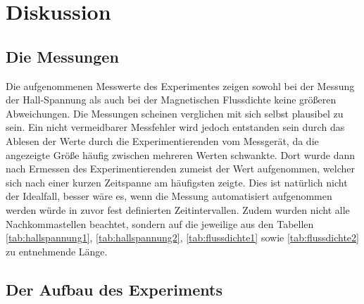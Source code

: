 \section{Diskussion}
\subsection{Die Messungen}
  Die aufgenommenen Messwerte des Experimentes zeigen sowohl bei der Messung der Hall-Spannung als auch
  bei der Magnetischen Flussdichte keine größeren Abweichungen. Die Messungen scheinen verglichen mit sich selbst
  plausibel zu sein. Ein nicht vermeidbarer Messfehler wird jedoch entstanden sein durch das Ablesen der Werte durch
  die Experimentierenden vom Messgerät, da die angezeigte Größe häufig zwischen mehreren Werten schwankte. Dort wurde
  dann nach Ermessen des Experimentierenden zumeist der Wert aufgenommen, welcher sich nach einer kurzen Zeitspanne am
  häufigsten zeigte. Dies ist natürlich nicht der Idealfall, besser wäre es, wenn die Messung automatisiert aufgenommen
  werden würde in zuvor fest definierten Zeitintervallen. Zudem wurden nicht alle Nachkommastellen beachtet, sondern auf
  die jeweilige aus den Tabellen \ref{tab:hallspannung1}, \ref{tab:hallspannung2}, \ref{tab:flussdichte1} sowie
  \ref{tab:flussdichte2} zu entnehmende Länge.
\subsection{Der Aufbau des Experiments}
  
\label{sec:Diskussion}
